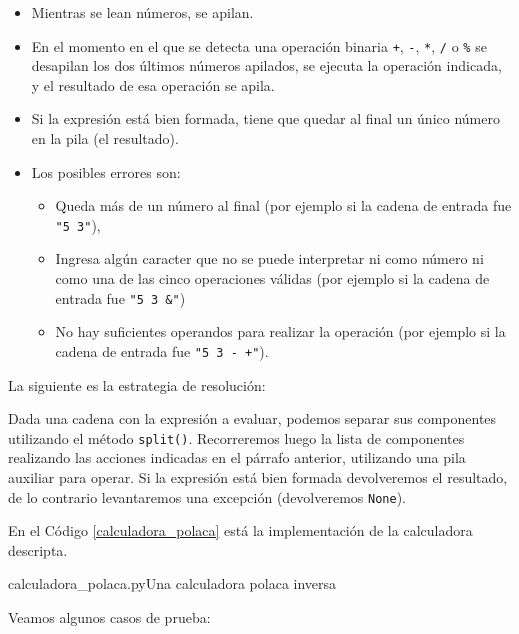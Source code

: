 \begin{itemize}
\item Mientras se lean números, se apilan.

\item En el momento en el que se detecta una operación binaria \verb|+|,
\verb|-|, \verb|*|, \verb|/| o \verb|%| se desapilan los dos últimos
números apilados, se ejecuta la operación indicada, y el resultado de esa
operación se apila.

\item Si la expresión está bien formada, tiene que quedar al final un único
número en la pila (el resultado).

\item Los posibles errores son:

\begin{itemize}
\item Queda más de un número al final (por ejemplo si la cadena de entrada
fue \verb|"5 3"|),

\item Ingresa algún caracter que no se puede interpretar ni como número ni como
una de las cinco operaciones válidas (por ejemplo si la cadena de entrada
fue \verb|"5 3 &"|)

\item No hay suficientes operandos para realizar la operación (por ejemplo
si la cadena de entrada fue \verb|"5 3 - +"|).
\end{itemize}
\end{itemize}

La siguiente es la estrategia de resolución:

Dada una cadena con la expresión a evaluar, podemos separar sus componentes
utilizando el método \lstinline!split()!.  Recorreremos luego la lista de
componentes realizando las acciones indicadas en el párrafo anterior,
utilizando una pila auxiliar para operar. Si la expresión está bien formada
devolveremos el resultado, de lo contrario levantaremos una excepción
(devolveremos \lstinline!None!).

En el Código \ref{calculadora_polaca} está la implementación de la
calculadora descripta.

\begin{codigo}{\label{calculadora_polaca} calculadora\_polaca.py}{Una calculadora polaca inversa}

\end{codigo}

Veamos algunos casos de prueba:

